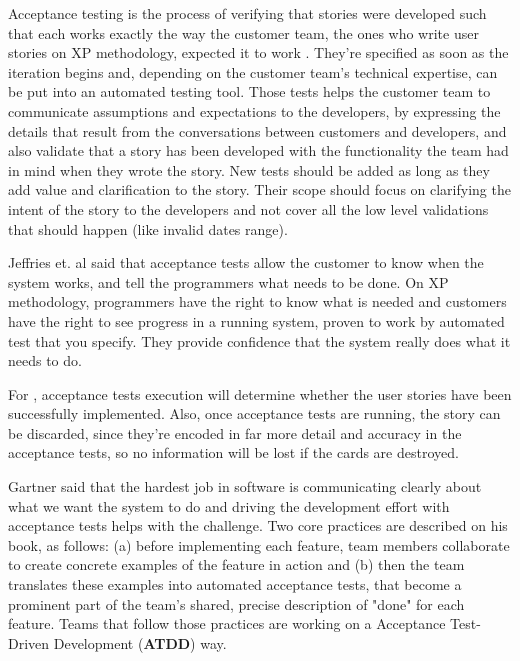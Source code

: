 Acceptance testing is the process of verifying that stories were developed such that each works exactly the way the customer team, the ones who write user stories on XP methodology, expected it to work \cite{Cohn_2004}. They're specified as soon as the iteration begins and, depending on the customer team's technical expertise, can be put into an automated testing tool. Those tests helps the customer team to communicate assumptions and expectations to the developers, by expressing the details that result from the conversations between customers and developers, and also validate that a story has been developed with the functionality the team had in mind when they wrote the story. New tests should be added as long as they add value and clarification to the story. Their scope should focus on clarifying the intent of the story to the developers and not cover all the low level validations that should happen (like invalid dates range).

Jeffries et. al \cite{Jeffries_2000} said that acceptance tests allow the customer to know when the system works, and tell the programmers what needs to be done. On XP methodology, programmers have the right to know what is needed and customers have the right to see progress in a running system, proven to work by automated test that you specify. They provide confidence that the system really does what it needs to do.

For \cite{Beck_Fowler_2000}, acceptance tests execution will determine whether the user stories have been successfully implemented. Also, once acceptance tests are running, the story can be discarded, since they're encoded in far more detail and accuracy in the acceptance tests, so no information will be lost if the cards are destroyed.

Gartner \cite{Gartner_2012} said that the hardest job in software is communicating clearly about what we want the system to do and driving the development effort with acceptance tests helps with the challenge. Two core practices are described on his book, as follows: (a) before implementing each feature, team members collaborate to create concrete examples of the feature in action and (b) then the team translates these examples into automated acceptance tests, that become a prominent part of the team's shared, precise description of "done" for each feature. Teams that follow those practices are working on a Acceptance Test-Driven Development (\textbf{ATDD}) way.

